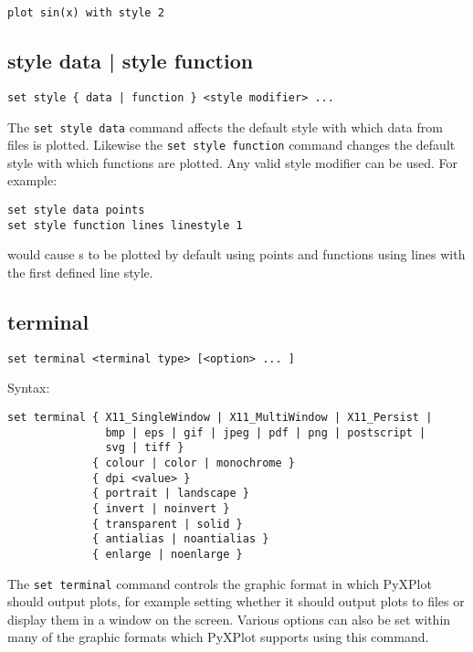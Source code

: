 \begin{verbatim}
plot sin(x) with style 2
\end{verbatim}


\subsection{style data | style function}

\begin{verbatim}
set style { data | function } <style modifier> ...
\end{verbatim}

The {\tt set style data} command affects the default style with which data from
files is plotted.  Likewise the {\tt set style function} command changes the
default style with which functions are plotted.  Any valid style modifier can
be used.  For example:

\begin{verbatim}
set style data points
set style function lines linestyle 1
\end{verbatim}

\noindent would cause \datafile s to be plotted by default using points and
functions using lines with the first defined line style.


\subsection{terminal}

\begin{verbatim}
set terminal <terminal type> [<option> ... ]
\end{verbatim}

Syntax:

\begin{verbatim}
set terminal { X11_SingleWindow | X11_MultiWindow | X11_Persist |
               bmp | eps | gif | jpeg | pdf | png | postscript |
               svg | tiff }
             { colour | color | monochrome }
             { dpi <value> }
             { portrait | landscape }
             { invert | noinvert }
             { transparent | solid }
             { antialias | noantialias }
             { enlarge | noenlarge }
\end{verbatim}

The {\tt set terminal} command controls the graphic format in which PyXPlot
should output plots, for example setting whether it should output plots to files
or display them in a window on the screen. Various options can also be set
within many of the graphic formats which PyXPlot supports using this command.


